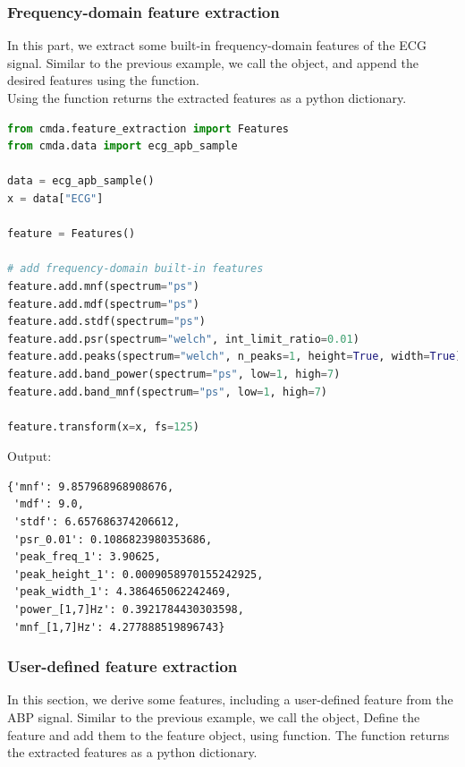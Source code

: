 \documentclass{article}
\begin{document}
\subsubsection{Frequency-domain feature extraction}
In this part, we extract some built-in frequency-domain features of the ECG signal. Similar to the previous example, we call the  object, and append the desired features using the  function.\\
Using the  function returns the extracted features as a python dictionary.
\begin{lstlisting}[language=Python, caption=Frequency-domain feature extraction]
from cmda.feature_extraction import Features
from cmda.data import ecg_apb_sample

data = ecg_apb_sample()
x = data["ECG"]

feature = Features()

# add frequency-domain built-in features
feature.add.mnf(spectrum="ps")
feature.add.mdf(spectrum="ps")
feature.add.stdf(spectrum="ps")
feature.add.psr(spectrum="welch", int_limit_ratio=0.01)
feature.add.peaks(spectrum="welch", n_peaks=1, height=True, width=True)
feature.add.band_power(spectrum="ps", low=1, high=7)
feature.add.band_mnf(spectrum="ps", low=1, high=7)

feature.transform(x=x, fs=125)
\end{lstlisting}

Output:
\begin{lstlisting}[caption=Frequency-domain feature extraction output]
{'mnf': 9.857968968908676,
 'mdf': 9.0,
 'stdf': 6.657686374206612,
 'psr_0.01': 0.1086823980353686,
 'peak_freq_1': 3.90625,
 'peak_height_1': 0.0009058970155242925,
 'peak_width_1': 4.386465062242469,
 'power_[1,7]Hz': 0.3921784430303598,
 'mnf_[1,7]Hz': 4.277888519896743}
\end{lstlisting}

\subsubsection{User-defined feature extraction}
In this section, we derive some features, including a user-defined feature from the ABP signal. Similar to the previous example, we call the  object, Define the feature and add them to the feature object, using  function. The  function returns the extracted features as a python dictionary.
\end{document}

